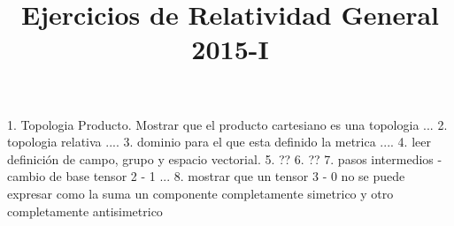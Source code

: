 \documentclass[english]{article}
\begin{document}
\title{Ejercicios de Relatividad General 2015-I}

\maketitle

1. Topologia Producto. Mostrar que el producto cartesiano es una topologia ...
2. topologia relativa ....
3. dominio para el que esta definido la metrica ....
4. leer definición de campo, grupo y espacio vectorial.
5. ??
6. ??
7. pasos intermedios - cambio de base tensor 2 - 1 ...
8. mostrar que un tensor 3 - 0 no se puede expresar como la suma un componente completamente simetrico y otro completamente antisimetrico
\end{document}
